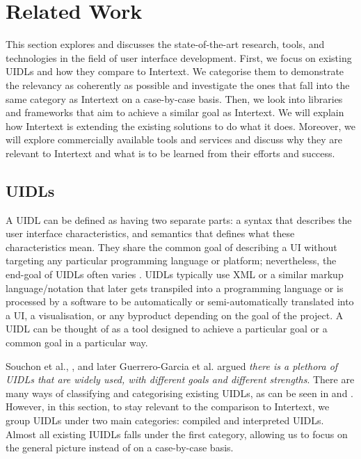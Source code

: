 
\chapter{Related Work} \label{relatedWork}

This section explores and discusses the state-of-the-art research, tools, and technologies in the field of user interface development. First, we focus on existing UIDLs and how they compare to Intertext. We categorise them to demonstrate the relevancy as coherently as possible and investigate the ones that fall into the same category as Intertext on a case-by-case basis. Then, we look into libraries and frameworks that aim to achieve a similar goal as Intertext. We will explain how Intertext is extending the existing solutions to do what it does. Moreover, we will explore commercially available tools and services and discuss why they are relevant to Intertext and what is to be learned from their efforts and success.

\section{UIDLs} \label{relatedUIDLs}

A UIDL can be defined as having two separate parts: a syntax that describes the user interface characteristics, and semantics that defines what these characteristics mean. They share the common goal of describing a UI without targeting any particular programming language or platform; nevertheless, the end-goal of UIDLs often varies \cite{XMLCompliantUIDLs}. UIDLs typically use XML or a similar markup language/notation that later gets transpiled into a programming language or is processed by a software to be automatically or semi-automatically translated into a UI, a visualisation, or any byproduct depending on the goal of the project. A UIDL can be thought of as a tool designed to achieve a particular goal or a common goal in a particular way. 

Souchon et al., \cite{XMLCompliantUIDLs}, and later Guerrero-Garcia et al. \cite{UIDLTheoreticalSurvey} argued \textit{there is a plethora of UIDLs that are widely used, with different goals and different strengths}. There are many ways of classifying and categorising existing UIDLs, as can be seen in \cite{XMLCompliantUIDLs} and \cite{UIDLTheoreticalSurvey}. However, in this section, to stay relevant to the comparison to Intertext, we group UIDLs under two main categories: compiled and interpreted UIDLs. Almost all existing IUIDLs falls under the first category, allowing us to focus on the general picture instead of on a case-by-case basis.

